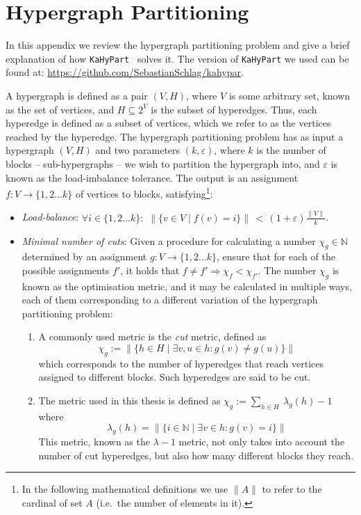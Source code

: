 \chapter{Hypergraph Partitioning}
\label{chap:HypPart}

In this appendix we review the hypergraph partitioning problem and give a brief explanation of how \texttt{KaHyPart}~\citep{KaHyPart} solves it. The version of \texttt{KaHyPart} we used can be found at: \url{https://github.com/SebastianSchlag/kahypar}.

A hypergraph is defined as a pair \((V,H)\), where \(V\) is some arbitrary set, known as the set of vertices, and \(H \subseteq 2^V\) is the subset of hyperedges. Thus, each hyperedge is defined as a subset of vertices, which we refer to as the vertices reached by the hyperedge. The hypergraph partitioning problem has as input a hypergraph \((V,H)\) and two parameters \((k,\varepsilon)\), where \(k\) is the number of blocks -- sub-hypergraphs -- we wish to partition the hypergraph into, and \(\varepsilon\) is known as the load-imbalance tolerance. The output is an assignment \(f\colon V \to \{1,2 \dots k\}\) of vertices to blocks, satisfying\footnote{In the following mathematical definitions we use \(\lVert A \rVert\) to refer to the cardinal of set \(A\) (i.e.\ the number of elements in it).}:

\begin{itemize}
  \item \textit{Load-balance}: \(\forall i \in \{1,2 \dots k\}\colon \,\, \lVert \{v \in V \mid f(v) = i\} \rVert \, < \, (1+\varepsilon)\frac{\lVert V \rVert}{k} \).
  \item \textit{Minimal number of cuts}: Given a procedure for calculating a number \(\chi_g \in \mathbb{N}\) determined by an assignment \(g\colon V \to \{1,2 \dots k\}\), ensure that for each of the possible assignments \(f'\), it holds that \(f \not = f' \Rightarrow  \chi_f < \chi_{f'}\). The number \(\chi_g\) is known as the optimisation metric, and it may be calculated in multiple ways, each of them corresponding to a different variation of the hypergraph partitioning problem:
    \begin{enumerate} 
      \renewcommand{\theenumi}{\alph{enumi})}
      \item A commonly used metric is the \textit{cut} metric, defined as \[\chi_g := \lVert \{h \in H \mid \exists v,u \in h\colon g(v) \not = g(u) \} \rVert\] which corresponds to the number of hyperedges that reach vertices assigned to different blocks. Such hyperedges are said to be cut. 
      \item The metric used in this thesis is defined as \(\chi_g := \sum_{h \in H} \ \lambda_g(h)\!-\! 1\) where \[\lambda_g(h) = \lVert \{i \in \mathbb{N} \mid \exists v \in h\colon g(v)=i \} \rVert\] This metric, known as the \(\lambda\!-\!1\) metric, not only takes into account the number of cut hyperedges, but also how many different blocks they reach.
    \end{enumerate}
\end{itemize}

